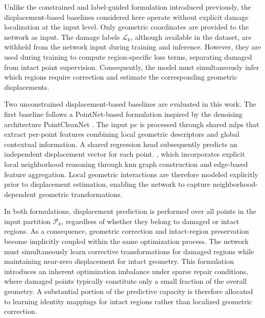 Unlike the constrained and label-guided formulation introduced previously, the displacement-based baselines considered here operate without explicit damage localization at the input level. Only geometric coordinates are provided to the network as input. The damage labels
\(\mathcal{L}_k\), although available in the dataset, are withheld from the network input during training and inference. However, they are used during training to compute region-specific loss terms, separating damaged from intact point supervision. Consequently, the model must simultaneously infer which regions require correction and estimate the corresponding geometric displacements.

Two unconstrained displacement-based baselines are evaluated in this work. The first baseline follows a PointNet-based formulation inspired by the denoising architecture PointCleanNet \cite{Marie2019}. The input \ac{pc} is processed through shared \acp{mlp} that extract per-point features combining local geometric descriptors and global contextual information. A shared regression head subsequently predicts an independent displacement vector for each point. \cite{FlowNet3D2019}, which incorporates explicit local neighborhood reasoning through \ac{knn} graph construction and edge-based feature aggregation. Local geometric interactions are therefore modeled explicitly prior to displacement estimation, enabling the network to capture neighborhood-dependent geometric transformations.



In both formulations, displacement prediction is performed over all points in the input partition \(\mathcal{P}_k\), regardless of whether they belong to damaged or intact regions. As a consequence, geometric correction and intact-region preservation become implicitly coupled within the same optimization process. The network must simultaneously learn corrective transformations for damaged regions while maintaining near-zero displacement for intact geometry. This formulation introduces an inherent optimization imbalance under sparse repair conditions, where damaged points typically constitute only a small fraction of the overall geometry. A substantial portion of the predictive capacity is therefore allocated to learning identity mappings for intact regions rather than localized geometric correction.

